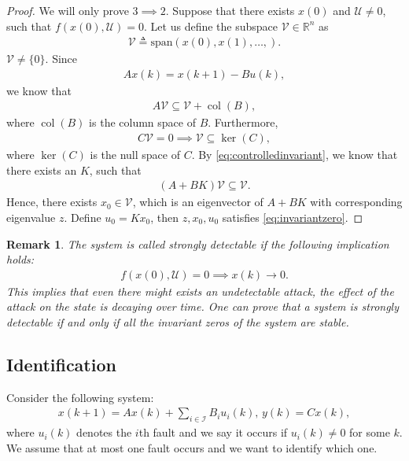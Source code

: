 \documentclass{article}
\newtheorem{remark}{Remark}
\renewcommand{\u}{{\mathcal U}}
\DeclareMathOperator{\col}{col}
\begin{document}
\begin{proof}
  We will only prove $3\implies 2$. Suppose that there exists $x(0)$ and $\u\neq 0$, such that $f(x(0),\u) = 0$. Let us define the subspace $\mathcal V\in \mathbb R^n$ as
  \begin{align*}
    \mathcal V \triangleq \text{span}(x(0),x(1),\dots,).
  \end{align*}
  $\mathcal V \neq \{0\}$. Since 
  \begin{align*}
   Ax(k) = x(k+1) -  B u(k),
  \end{align*}
 we know that
 \begin{align}
  A\mathcal V \subseteq \mathcal V + \col(B) ,
  \label{eq:controlledinvariant}
 \end{align}
 where $\col(B)$ is the column space of $B$. Furthermore,
 \begin{align*}
  C\mathcal V = 0 \implies \mathcal V\subseteq \ker(C), 
 \end{align*}
 where $\ker(C)$ is the null space of $C$. By \eqref{eq:controlledinvariant}, we know that there exists an $K$, such that
 \begin{align*}
  (A+BK)\mathcal V \subseteq \mathcal V.
 \end{align*}
 Hence, there exists $x_0 \in \mathcal V$, which is an eigenvector of $A+BK$ with corresponding eigenvalue $z$. Define $u_0 = Kx_0$, then $z,x_0,u_0$ satisfies \eqref{eq:invariantzero}.
\end{proof}

\begin{remark}
  The system is called strongly detectable if the following implication holds:
  \begin{align*}
   f(x(0),\u) = 0\implies x(k)\rightarrow 0. 
  \end{align*}
  This implies that even there might exists an undetectable attack, the effect of the attack on the state is decaying over time. One can prove that a system is strongly detectable if and only if all the invariant zeros of the system are stable.
\end{remark}

\subsection{Identification}
Consider the following system:
\begin{align}
  x(k+1) = A x(k) + \sum_{i\in \mathcal I}B_i u_i(k),\, y(k) = C x(k),
  \label{eq:ltisystem2}
\end{align}
where $u_i(k)$ denotes the $i$th fault and we say it occurs if $u_i(k)\neq 0$ for some $k$. We assume that at most one fault occurs and we want to identify which one.
\end{document}

